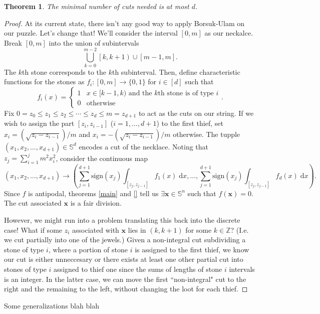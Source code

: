 \documentclass[12pt]{amsart}
\newtheorem{thm}{Theorem}[section]
\theoremstyle{definition}
\begin{document}
    \begin{thm}
      The minimal number of cuts needed is at most $d$.
    \end{thm}

    \begin{proof}
      At its current state, there isn't any good way to apply
      Borsuk-Ulam on our puzzle. Let's change that! We'll consider the
      interval $[0,m]$ as our neckalce. Break $[0,m]$ into the union
      of subintervals
      $$\bigcup_{k=0}^{m-2} \left[k, k+1\right) \cup \left[m-1,
        m\right].$$ The $k$th stone corresponds to the $k$th
      subinterval. Then, define characteristic functions for the
      stones as $f_i:[0,m] \to \{0,1\}$ for $i \in [d]$ such
      that
      $$f_i(x) = \begin{cases} 1 & x \in [k-1, k) \text{ and the $k$th
          stone is of type $i$}\\ 0 & \text{otherwise} \end{cases}.$$
      Fix
      $0 = z_0 \leq z_1 \leq z_2 \leq \cdots \leq z_d \leq m= z_{d+1}$
      to act as the cuts on our string. If we wish to assign the part
      $[z_i,z_{i-1}]$ ($i = 1, \ldots, d+1$) to the first thief, set
      $x_i = \left(\sqrt{z_{i} - z_{i-1}}\right)/m$ and
      $x_i = -\left(\sqrt{z_i - z_{i-1}}\right)/m$ otherwise. The
      tupple $(x_1,x_2,\ldots,x_{d+1}) \in \mathbb S^d$ encodes a cut
      of the necklace. Noting that $z_j = \sum_{i=1}^{j} m^2x_i^2$,
      consider the continuous map
      $$(x_1,x_2,\ldots,x_{d+1}) \to \left(\sum_{j=1}^{d+1}
        \mathrm{sign}(x_j) \int_{[z_j,z_{j-1}]} f_1(x) \; \mathrm{d}x
        , \ldots, \sum_{j=1}^{d+1} \mathrm{sign}(x_j)
        \int_{[z_j,z_{j-1}]} f_d(x) \; \mathrm{d}x\right).$$ Since $f$
      is antipodal, theorems \ref{main} and \ref{} tell us
      $\exists \mathbf x \in \mathbb S^n$ such that
      $f(\mathbf x) = 0$. The cut associated $\mathbf x$ is a fair
      division.

      However, we might run into a problem translating this back into
      the discrete case! What if some $z_i$ associated with
      $\mathbf x$ lies in $\left(k, k+1\right)$ for some
      $k \in \mathbb Z$? (I.e. we cut partially into one of the
      jewels.) Given a non-integral cut subdividing a stone of type
      $i$, where a portion of stone $i$ is assigned to the first
      thief, we know our cut is either unneccesary or there exists at
      least one other partial cut into stones of type $i$ assigned to
      thief one since the sums of lengths of stone $i$ intervals is an
      integer. In the latter case, we can move the first
      ``non-integral" cut to the right and the remaining to the left,
      without changing the loot for each thief.
    \end{proof}

    Some generalizations blah blah

    
    
    
  
\end{document}
